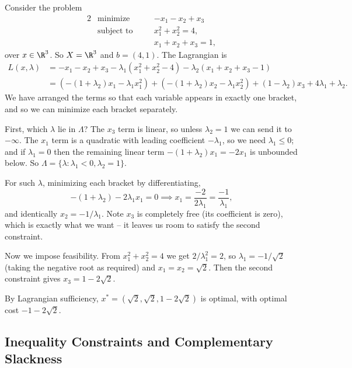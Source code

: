 \begin{example}
    Consider the problem
    \begin{alignat*}{2}
        & \text{minimize} \quad && -x_1 - x_2 + x_3 \\
        & \text{subject to} \quad && x_1^2 + x_2^2 = 4, \\
        & && x_1 + x_2 + x_3 = 1,
    \end{alignat*}
    over $x \in \R^3$. So $X = \R^3$ and $b = (4, 1)$. The Lagrangian is
    \begin{align*}
        L(x, \lambda) &= -x_1 - x_2 + x_3 - \lambda_1(x_1^2 + x_2^2 - 4) - \lambda_2(x_1 + x_2 + x_3 - 1)\\
        &= \left(-(1 + \lambda_2)x_1 - \lambda_1 x_1^2\right) + \left(-(1 + \lambda_2)x_2 - \lambda_1 x_2^2\right) + (1 - \lambda_2)x_3 + 4\lambda_1 + \lambda_2.
    \end{align*}
    We have arranged the terms so that each variable appears in exactly one bracket, and so we can minimize each bracket separately.

    First, which $\lambda$ lie in $\Lambda$? The $x_3$ term is linear, so unless $\lambda_2 = 1$ we can send it to $-\infty$. The $x_1$ term is a quadratic with leading coefficient $-\lambda_1$, so we need $\lambda_1 \leq 0$; and if $\lambda_1 = 0$ then the remaining linear term $-(1 + \lambda_2)x_1 = -2x_1$ is unbounded below. So $\Lambda = \{\lambda : \lambda_1 < 0, \lambda_2 = 1\}$.

    For such $\lambda$, minimizing each bracket by differentiating,
    $$
    -(1 + \lambda_2) - 2\lambda_1 x_1 = 0 \implies x_1 = \frac{-2}{2\lambda_1} = \frac{-1}{\lambda_1},
    $$
    and identically $x_2 = -1/\lambda_1$. Note $x_3$ is completely free (its coefficient is zero), which is exactly what we want -- it leaves us room to satisfy the second constraint.

    Now we impose feasibility. From $x_1^2 + x_2^2 = 4$ we get $2/\lambda_1^2 = 2$, so $\lambda_1 = -1/\sqrt{2}$ (taking the negative root as required) and $x_1 = x_2 = \sqrt{2}$. Then the second constraint gives $x_3 = 1 - 2\sqrt{2}$.

    By Lagrangian sufficiency, $x^* = (\sqrt 2, \sqrt2, 1 - 2\sqrt 2)$ is optimal, with optimal cost $-1 - 2\sqrt 2$.
\end{example}

\subsection{Inequality Constraints and Complementary Slackness}

